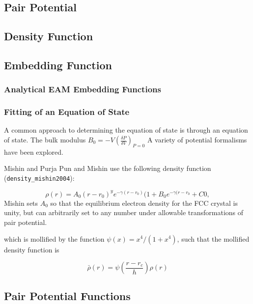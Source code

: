 \subsection{Pair Potential}

\subsection{Density Function}

\subsection{Embedding Function}

\subsubsection{Analytical EAM Embedding Functions}

\subsubsection{Fitting of an Equation of State}

A common approach to determining the equation of state is through an equation of state.
The bulk modulus $B_0 = -V\left( \frac{\delta P}{\delta V} \right)_{P=0}$
A variety of potential formalisms have been explored.



Mishin\cite{mishin2004_eam_NiAl} and Purja Pun and Mishin\cite{purjapun2009_eam_NiAl} use the following density function (\verb|density_mishin2004|):

\begin{equation}
\label{eq:density_mishin2004}
	\rho(r) = A_0 (r-r_0)^y e^{-\gamma (r-r_0)}(1+B_0 e^{-\gamma (r-r_0} + C0,
\end{equation}
Mishin sets $A_{0}$ so that the equilibrium electron density for the FCC crystal is unity, but can arbitrarily set to any number under allowable transformations of pair potential.

which is mollified by the function $\psi(x) = x^4 / (1+x^4)$, such that the mollified density function is

\begin{equation}
    \bar{\rho}(r) = \psi \left(\frac{r-r_c}{h}\right)\rho(r)
\end{equation}

\subsection{Pair Potential Functions}


